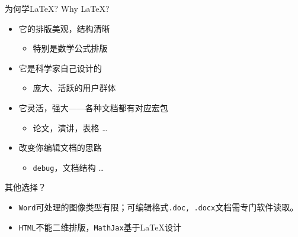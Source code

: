 \documentclass{beamer}
\subtitle{第一节：基本操作}
\begin{document}
\begin{frame}
\titlepage
\end{frame}

\begin{frame}{为何学\LaTeX{}? Why \LaTeX{}?}
\begin{itemize}
\item 它的排版美观，结构清晰
\begin{itemize}
\item 特别是数学公式排版
\end{itemize}
%
\item 它是科学家自己设计的
\begin{itemize}
\item 庞大、活跃的用户群体
\end{itemize}
%
\item 它灵活，强大——各种文档都有对应宏包
\begin{itemize}
\item 论文，演讲，表格 \ldots 
\end{itemize}
\item 改变你编辑文档的思路
\begin{itemize}
\item \texttt{debug}，文档结构 \ldots
\end{itemize}
\end{itemize}

\begin{block}{其他选择？}
\begin{itemize}
  \item \texttt{Word}可处理的图像类型有限；可编辑格式\texttt{.doc, .docx}文档需专门软件读取。
  \item \texttt{HTML}不能二维排版，\texttt{MathJax}基于\LaTeX 设计
\end{itemize}
\end{block}
\end{frame}
\end{document}
